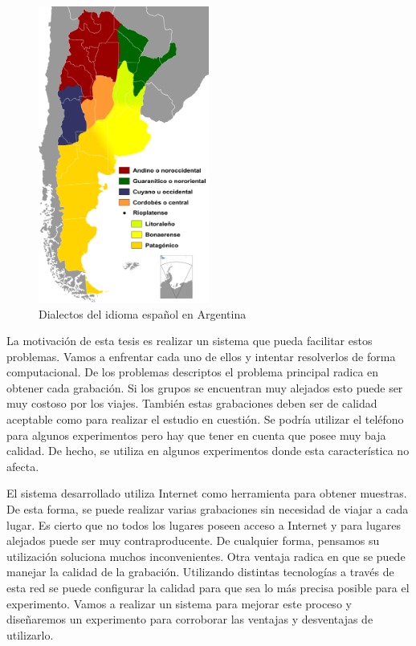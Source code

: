 \documentclass[11pt,a4paper,twoside]{tesis}
\begin{document}
\begin{figure}[h!]
    \includegraphics[width=0.5\textwidth]{Dialectos_del_idioma_espanol_en_Argentina} 
    \caption{Dialectos del idioma español en Argentina}
    \label{fig11}
\end{figure}

La motivación de esta tesis es realizar un sistema que pueda facilitar estos problemas. Vamos a enfrentar cada uno de ellos y intentar resolverlos de forma computacional. De los problemas descriptos el problema principal radica en obtener cada grabación. Si los grupos se encuentran muy alejados esto puede ser muy costoso por los viajes. También estas grabaciones deben ser de calidad aceptable como para realizar el estudio en cuestión. Se podría utilizar el teléfono para algunos experimentos pero hay que tener en cuenta que posee muy baja calidad. De hecho, se utiliza en algunos experimentos donde esta característica no afecta. 

El sistema desarrollado utiliza Internet como herramienta para obtener muestras. De esta forma, se puede realizar varias grabaciones sin necesidad de viajar a cada lugar. Es cierto que no todos los lugares poseen acceso a Internet y para lugares alejados puede ser muy contraproducente. De cualquier forma, pensamos su utilización soluciona muchos inconvenientes. Otra ventaja radica en que se puede manejar la calidad de la grabación. Utilizando distintas tecnologías a través de esta red se puede configurar la calidad para que sea lo más precisa posible para el experimento. Vamos a realizar un sistema para mejorar este proceso y diseñaremos un experimento para corroborar las ventajas y desventajas de utilizarlo. 
\end{document}
